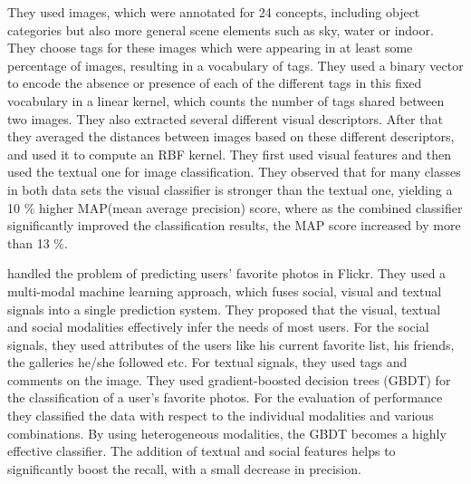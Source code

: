 They used images, which were annotated for 24 concepts, including
object categories but also more general scene elements such as sky,
water or indoor.  They choose tags for these images which were
appearing in at least some percentage of  images, resulting in a
vocabulary of  tags. They used a binary vector  to encode the
absence or presence of each of the different tags in this fixed
vocabulary in a linear kernel, which counts the number of tags
shared between two images. They also extracted several different
visual descriptors. After that they averaged the distances between
images based on these different descriptors, and used it to compute
an RBF kernel. They first used visual features and then used the
textual one for image classification. They observed  that for many
classes in both data sets the visual classifier is stronger than the
textual one, yielding a 10
     $\%$ higher MAP(mean average precision) score, where as the combined  classifier significantly improved the classification results, the MAP score increased by more than 13 $\%$.



\citet*{vanZwol} handled the problem of predicting users'
favorite photos in Flickr. They used a multi-modal machine learning
approach, which fuses social, visual and textual signals into a
single prediction system. They proposed that the  visual, textual
and social modalities effectively infer the needs of most users. For
the social signals, they used attributes of the users like his
current favorite list, his friends, the galleries he/she followed etc.
For textual signals, they used tags and comments on the image.
They used gradient-boosted decision trees (GBDT) for the
classification of a user's favorite photos. For the evaluation of
performance they classified the data with
respect to the individual modalities and various combinations. By
using heterogeneous modalities, the GBDT becomes a highly effective
classifier. The addition of textual  and social features helps to
significantly boost the recall, with a small decrease in precision.



